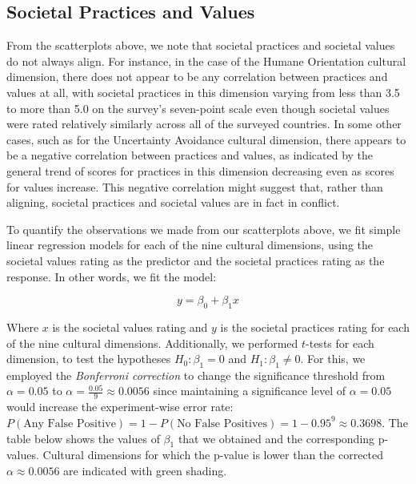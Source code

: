 \documentclass[
]{article}
\begin{document}
\hypertarget{societal-practices-and-values}{%
\subsection{Societal Practices and
Values}\label{societal-practices-and-values}}

From the scatterplots above, we note that societal practices and
societal values do not always align. For instance, in the case of the
Humane Orientation cultural dimension, there does not appear to be any
correlation between practices and values at all, with societal practices
in this dimension varying from less than 3.5 to more than 5.0 on the
survey's seven-point scale even though societal values were rated
relatively similarly across all of the surveyed countries. In some other
cases, such as for the Uncertainty Avoidance cultural dimension, there
appears to be a negative correlation between practices and values, as
indicated by the general trend of scores for practices in this dimension
decreasing even as scores for values increase. This negative correlation
might suggest that, rather than aligning, societal practices and
societal values are in fact in conflict.

To quantify the observations we made from our scatterplots above, we fit
simple linear regression models for each of the nine cultural
dimensions, using the societal values rating as the predictor and the
societal practices rating as the response. In other words, we fit the
model:

\[
y = \beta_0 + \beta_1 x
\]

Where \(x\) is the societal values rating and \(y\) is the societal
practices rating for each of the nine cultural dimensions. Additionally,
we performed \(t\)-tests for each dimension, to test the hypotheses
\(H_0: \beta_1 = 0\) and \(H_1: \beta_1 \ne 0\). For this, we employed
the \emph{Bonferroni correction} to change the significance threshold
from \(\alpha = 0.05\) to \(\alpha = \frac{0.05}{9} \approx 0.0056\)
since maintaining a significance level of \(\alpha = 0.05\) would
increase the experiment-wise error rate:
\(P(\text{Any False Positive}) = 1 - P(\text{No False Positives}) = 1 - 0.95^{9} \approx 0.3698\).
The table below shows the values of \(\beta_1\) that we obtained and the
corresponding p-values. Cultural dimensions for which the p-value is
lower than the corrected \(\alpha \approx 0.0056\) are indicated with
green shading.
\end{document}
